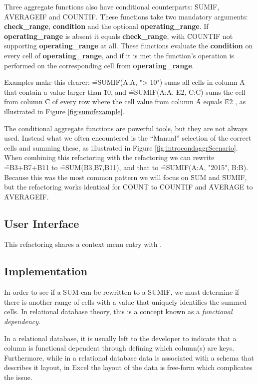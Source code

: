 Three aggregate functions also have conditional counterparts: \f{SUMIF}, \f{AVERAGEIF} and \f{COUNTIF}.
These functions take two mandatory arguments: \textbf{check_range}, \textbf{condition} and the optional \textbf{operating_range}.
If \textbf{operating_range} is absent it equals \textbf{check_range}, with \f{COUNTIF} not supporting \textbf{operating_range} at all.
These functions evaluate the \textbf{condition} on every cell of \textbf{operating_range}, and if it is met the function's operation is performed on the corresponding cell from \textbf{operating_range}.

Examples make this clearer: \f{=SUMIF(A:A, "> 10")} sums all cells in column \f{A} that contain a value larger than \f{10}, and \f{=SUMIF(A:A, E2, C:C)} sums the cell from column \f{C} of every row where the cell value from column \f{A} equals \f{E2} , as illustrated in Figure \ref{fig:sumifexample}.

The conditional aggregate functions are powerful tools, but they are not always used. 
Instead what we often encountered is the ``Manual'' selection of the correct cells and summing these, as illustrated in Figure \ref{fig:introcondaggrScenario}.
When combining this refactoring with the  refactoring we can rewrite \f{=B3+B7+B11} to \f{=SUM(B3,B7,B11)}, and that to \f{=SUMIF(A:A, "2015", B:B)}.
Because this was the most common pattern we will focus on \f{SUM} and \f{SUMIF}, but the refactoring works identical for \f{COUNT} to \f{COUNTIF} and \f{AVERAGE} to \f{AVERAGEIF}.

\subsection{User Interface}

This refactoring shares a context menu entry with .

\subsection{Implementation}

In order to see if a \f{SUM} can be rewritten to a \f{SUMIF}, we must determine if there is another range of cells with a value that uniquely identifies the summed cells.
In relational database theory, this is a concept known as a \emph{functional dependency}.

In a relational database, it is usually left to the developer to indicate that a column is functional dependent through defining which column(s) are keys.
Furthermore, while in a relational database data is associated with a schema that describes it layout, in Excel the layout of the data is free-form which complicates the issue.

